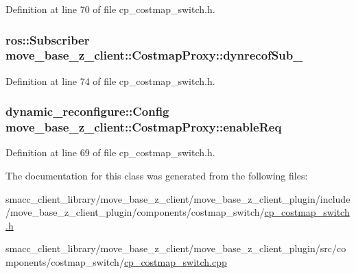 Definition at line 70 of file cp\+\_\+costmap\+\_\+switch.\+h.

\subsubsection[{\texorpdfstring{dynrecof\+Sub\+\_\+}{dynrecofSub_}}]{\setlength{\rightskip}{0pt plus 5cm}ros\+::\+Subscriber move\+\_\+base\+\_\+z\+\_\+client\+::\+Costmap\+Proxy\+::dynrecof\+Sub\+\_\+\hspace{0.3cm}{\ttfamily [private]}}\hypertarget{classmove__base__z__client_1_1CostmapProxy_a3202a0b1208f7b36c4a707f633d63504}{}\label{classmove__base__z__client_1_1CostmapProxy_a3202a0b1208f7b36c4a707f633d63504}


Definition at line 74 of file cp\+\_\+costmap\+\_\+switch.\+h.

\subsubsection[{\texorpdfstring{enable\+Req}{enableReq}}]{\setlength{\rightskip}{0pt plus 5cm}dynamic\+\_\+reconfigure\+::\+Config move\+\_\+base\+\_\+z\+\_\+client\+::\+Costmap\+Proxy\+::enable\+Req\hspace{0.3cm}{\ttfamily [private]}}\hypertarget{classmove__base__z__client_1_1CostmapProxy_a8839c249af6a53a7dc8f2672966cbbae}{}\label{classmove__base__z__client_1_1CostmapProxy_a8839c249af6a53a7dc8f2672966cbbae}


Definition at line 69 of file cp\+\_\+costmap\+\_\+switch.\+h.



The documentation for this class was generated from the following files\+:\begin{DoxyCompactItemize}
\item 
smacc\+\_\+client\+\_\+library/move\+\_\+base\+\_\+z\+\_\+client/move\+\_\+base\+\_\+z\+\_\+client\+\_\+plugin/include/move\+\_\+base\+\_\+z\+\_\+client\+\_\+plugin/components/costmap\+\_\+switch/\hyperlink{cp__costmap__switch_8h}{cp\+\_\+costmap\+\_\+switch.\+h}\item 
smacc\+\_\+client\+\_\+library/move\+\_\+base\+\_\+z\+\_\+client/move\+\_\+base\+\_\+z\+\_\+client\+\_\+plugin/src/components/costmap\+\_\+switch/\hyperlink{cp__costmap__switch_8cpp}{cp\+\_\+costmap\+\_\+switch.\+cpp}\end{DoxyCompactItemize}
